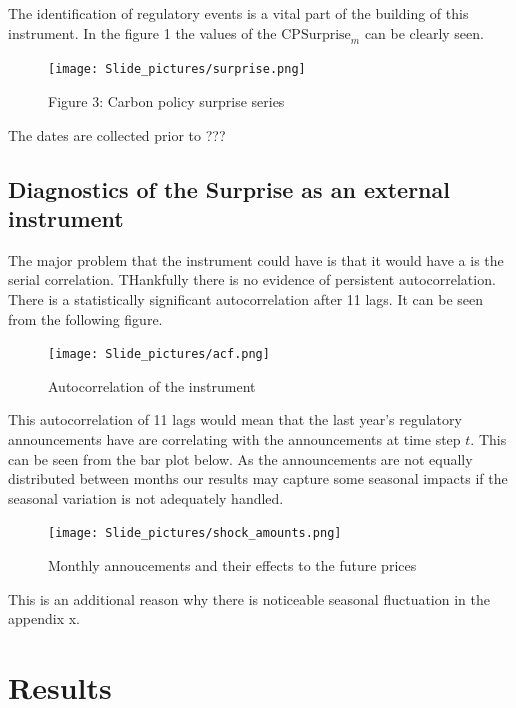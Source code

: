 \documentclass[
  12pt,
  a4paper,
]{report}
\begin{document}
The identification of regulatory events is a vital part of the building of this instrument. In the figure 1 the values of the \(\text{CPSurprise}_m\) can be clearly seen.

\begin{figure}
\centering
\texttt{[image: Slide\_pictures/surprise.png]}
\caption{Figure 3: Carbon policy surprise series}
\end{figure}

The dates are collected prior to ???

\hypertarget{diagnostics-of-the-surprise-as-an-external-instrument}{%
\section{Diagnostics of the Surprise as an external instrument}\label{diagnostics-of-the-surprise-as-an-external-instrument}}

The major problem that the instrument could have is that it would have a is the serial correlation. THankfully there is no evidence of persistent autocorrelation. There is a statistically significant autocorrelation after 11 lags. It can be seen from the following figure.

\begin{figure}
\centering
\texttt{[image: Slide\_pictures/acf.png]}
\caption{Autocorrelation of the instrument}
\end{figure}

This autocorrelation of 11 lags would mean that the last year's regulatory announcements have are correlating with the announcements at time step \(t\). This can be seen from the bar plot below. As the announcements are not equally distributed between months our results may capture some seasonal impacts if the seasonal variation is not adequately handled.

\begin{figure}
\centering
\texttt{[image: Slide\_pictures/shock\_amounts.png]}
\caption{Monthly annoucements and their effects to the future prices}
\end{figure}

This is an additional reason why there is noticeable seasonal fluctuation in the appendix x.

\newpage

\hypertarget{results}{%
\chapter{Results}\label{results}}
\end{document}
